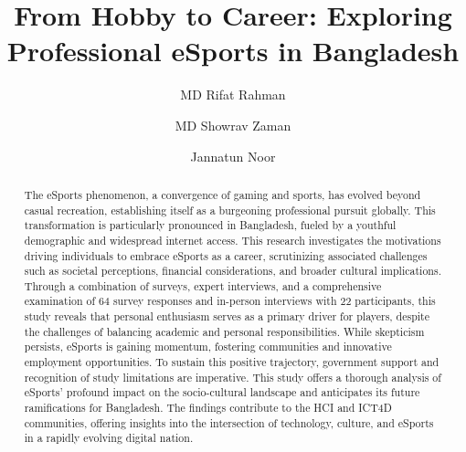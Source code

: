 \documentclass[manuscript,screen,review,anonymous]{acmart}
\title{From Hobby to Career: Exploring Professional eSports in Bangladesh}
\author{MD Rifat Rahman}
\affiliation{%
  \institution{BRAC University}
  \city{Dhaka}
  \country{Bangladesh}
}
\author{MD Showrav Zaman}
\affiliation{%
  \institution{BRAC University}
  \city{Dhaka}
  \country{Bangladesh}
}
\author{Jannatun Noor}
\affiliation{%
  \institution{BRAC University}
  \city{Dhaka}
  \country{Bangladesh}
}
\begin{document}
\begin{abstract}
    

The eSports phenomenon, a convergence of gaming and sports, has evolved beyond casual recreation, establishing itself as a burgeoning professional pursuit globally. This transformation is particularly pronounced in Bangladesh, fueled by a youthful demographic and widespread internet access. This research investigates the motivations driving individuals to embrace eSports as a career, scrutinizing associated challenges such as societal perceptions, financial considerations, and broader cultural implications. Through a combination of surveys, expert interviews, and a comprehensive examination of 64 survey responses and in-person interviews with 22 participants, this study reveals that personal enthusiasm serves as a primary driver for players, despite the challenges of balancing academic and personal responsibilities. While skepticism persists, eSports is gaining momentum, fostering communities and innovative employment opportunities. To sustain this positive trajectory, government support and recognition of study limitations are imperative. This study offers a thorough analysis of eSports' profound impact on the socio-cultural landscape and anticipates its future ramifications for Bangladesh. The findings contribute to the HCI and ICT4D communities, offering insights into the intersection of technology, culture, and eSports in a rapidly evolving digital nation.


\end{abstract}
\maketitle
\end{document}

